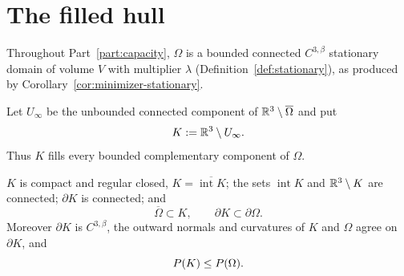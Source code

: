 \chapter{The filled hull}\label{ch:hull}

\begin{notation}\label{not:stationary}
Throughout Part~\ref{part:capacity}, $\Omega$ is a bounded connected
$C^{3,\beta}$ stationary domain of volume $V$ with multiplier $\lambda$
(Definition~\ref{def:stationary}), as produced by
Corollary~\ref{cor:minimizer-stationary}.
\end{notation}

\begin{definition}\label{def:hull}
Let $U_\infty$ be the unbounded connected component of
$\mathbb R^3\setminus\overline\Omega$ and put
\begin{equation}\label{eq:hull}
  K:=\mathbb R^3\setminus U_\infty .
\end{equation}
Thus $K$ fills every bounded complementary component of $\Omega$.
\end{definition}

\begin{lemma}\label{lem:hull-properties}
$K$ is compact and regular closed, $K=\overline{\operatorname{int}K}$; the sets
$\operatorname{int}K$ and $\mathbb R^3\setminus K$ are connected; $\partial K$ is
connected; and
\begin{equation}\label{eq:hull-inclusions}
  \overline\Omega\subset K,\qquad\partial K\subset\partial\Omega .
\end{equation}
Moreover $\partial K$ is $C^{3,\beta}$, the outward normals and curvatures of
$K$ and $\Omega$ agree on $\partial K$, and
\begin{equation}\label{eq:hull-perimeter}
  P(K)\le P(\Omega).
\end{equation}
\end{lemma}

